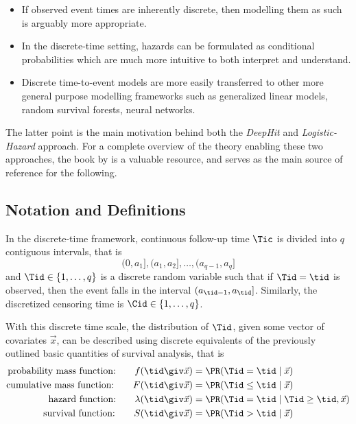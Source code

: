 \begin{itemize}
    \item If observed event times are inherently discrete, 
        then modelling them as such is arguably more appropriate. 
    \item In the discrete-time setting, hazards can be formulated as 
        conditional probabilities which are much more intuitive to 
        both interpret and understand.
    \item Discrete time-to-event models are more easily transferred to 
        other more general purpose modelling frameworks 
        such as generalized linear models, random survival forests, 
        neural networks.
\end{itemize}

The latter point is the main motivation behind both 
the \emph{DeepHit} and \emph{Logistic-Hazard} approach.
For a complete overview of the theory enabling these two approaches,
the book by \textcite{tutzModeling2016} is a valuable resource, 
and serves as the main source of reference for the following.

\subsection{Notation and Definitions}

In the discrete-time framework, 
continuous follow-up time \(\Tic\) is divided into \(q\) contiguous intervals,
that is
%
\begin{equation*}
	(0, a_1], (a_1, a_2], \dots, (a_{q-1}, a_q]
\end{equation*}
%
and \(\Tid \in \{1, \dots, q\}\) is a discrete random  variable
such that if \(\Tid = \tid\) is observed, then the event 
falls in the interval \((a_{\tid-1}, a_{\tid}]\).
Similarly, the discretized censoring time is \(\Cid \in \{1, \dots, q\}\).

With this discrete time scale, 
the distribution of \(\Tid\), 
given some vector of covariates \(\vec{x}\),
can be described using discrete equivalents of the previously 
outlined basic quantities of survival analysis, that is
%
\begin{align}
    \text{probability mass function:} \qquad
    f(\tid \giv \vec{x}) 
    &= \PR (\Tid = \tid \mid \vec{x}) \\
    \text{cumulative mass function:} \qquad
    F(\tid \giv \vec{x}) 
    &= \PR (\Tid \leq \tid \mid \vec{x}) \\
    \label{eq:discrete-hazard}
    \text{hazard function:} \qquad
    \lambda(\tid \giv \vec{x}) 
    &= \PR (\Tid = \tid \mid \Tid \geq \tid, \vec{x}) \\
    \text{survival function:} \qquad
    S(\tid \giv \vec{x}) 
    &= \PR (\Tid > \tid \mid \vec{x})
\end{align}

